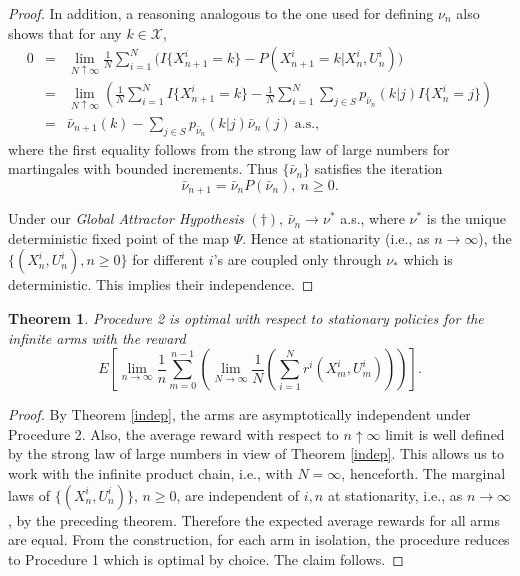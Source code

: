 \documentclass[12pt]{article}
\newtheorem{theorem}{Theorem}[section]
\numberwithin{equation}{section}
\newcommand{\1}{\textbf{1}}
\newcommand{\X}{\mathcal{X}}
\begin{document}
\begin{proof}
In addition, a reasoning analogous to the one used for defining $\nu_n$ also shows that for any $k \in \X$,
\begin{eqnarray*}
0 &=&\lim_{N\uparrow\infty}\frac{1}{N}\sum_{i=1}^N\Big(I\{X^i_{n+1} = k\} - P(X^i_{n+1} = k|X^i_n, U^i_n)\Big) \\
&=& \lim_{N\uparrow\infty}\left(\frac{1}{N}\sum_{i=1}^NI\{X^i_{n+1} = k\} - \frac{1}{N}\sum_{i=1}^N\sum_{j\in S}p_{\bar{\nu}_n}(k|j)I\{X^i_n=j\}\right) \\
&=& \bar{\nu}_{n+1}(k) - \sum_{j\in S}p_{\bar{\nu}_n}(k|j)\bar{\nu}_n(j)  \   \mbox{a.s.}, 
\end{eqnarray*}
where the first equality follows from the strong law of large numbers for martingales with bounded increments. 
Thus $\{\bar{\nu}_n\}$ satisfies the iteration
\begin{equation}
\bar{\nu}_{n+1} = \bar{\nu}_nP(\bar{\nu}_n), \ n \geq 0. \label{nuiteration}
\end{equation}

Under our \textit{Global Attractor Hypothesis} \textbf{$(\dagger)$},  $\bar{\nu}_n \to \nu^*$ a.s., where $\nu^*$ is the unique deterministic fixed point of the map $\Psi$. Hence at stationarity (i.e., as $n\to\infty$), the $\{(X^i_n, U^i_n), n \geq 0\}$ for different $i$'s are coupled only through $\nu_*$ which is deterministic. This implies their independence.
\end{proof}

\begin{theorem} Procedure 2 is optimal with respect to stationary policies for the infinite arms with the reward
$$E\left[\lim_{n\to\infty}\frac{1}{n}\sum_{m=0}^{n-1}\left(\lim_{N\to\infty}\frac{1}{N}\left(\sum_{i=1}^{N}r^i(X^i_m, U^i_m)\right)\right)\right].$$ 
\end{theorem}

\begin{proof} By Theorem \ref{indep}, the arms are asymptotically independent under Procedure 2.  Also, the  average reward with respect to  $n\uparrow\infty$ limit is well defined by the strong law of large numbers in view of Theorem \ref{indep}. This allows us to work with the infinite product chain, i.e., with $N = \infty$, henceforth. The marginal laws of $\{(X^i_n, U^i_n)\}$, $n \geq 0$, are independent of $i,n$ at stationarity, i.e., as $n\to\infty$, by the preceding theorem.  Therefore the expected average rewards for all arms are equal. From the construction, for each arm in isolation, the procedure reduces to Procedure 1 which is optimal by choice. The claim follows. \end{proof}
\end{document}
